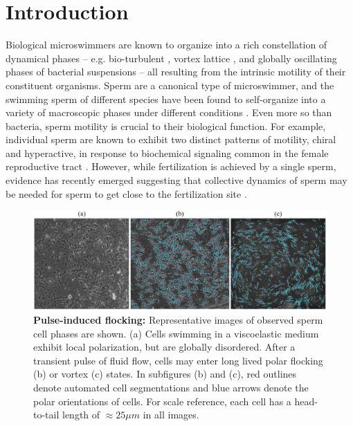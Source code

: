 \documentclass[reprint,unsortedaddress,amsmath,amssymb,aps,pre]{revtex4-2}
\begin{document}
\maketitle



\section{\label{sec::Introduction}Introduction}



Biological microswimmers are known to organize into a rich constellation of dynamical phases -- e.g. bio-turbulent \cite{2012_Wensink}, vortex lattice  \cite{2012_Nagai,xu2024self}, and globally oscillating phases \cite{2017_Chen} of bacterial suspensions -- all resulting from the intrinsic motility of their constituent organisms.
Sperm are a canonical type of microswimmer, and the swimming sperm of different species have been found to self-organize into a variety of macroscopic phases under different conditions \cite{riedel2005self,creppy2015turbulence}. Even more so than bacteria, sperm motility is crucial to their biological function. For example, individual sperm are known to exhibit two distinct patterns of motility, chiral and hyperactive, in response to biochemical signaling common in the female reproductive tract \cite{zaferani2023biphasic}. However, while fertilization is achieved by a single sperm, evidence has recently emerged suggesting that collective dynamics of sperm may be needed for sperm to get close to the fertilization site \cite{Qu2021cooperation,Phuyal2022}. 

\begin{figure}[t!]
    \centering
    \includegraphics[width=18cm]{fig_ExperimentalSnapshots.PNG}
    \caption{\label{fig::ExpMethods}
    \textbf{Pulse-induced flocking:} Representative images of observed sperm cell phases are shown. (a) Cells swimming in a viscoelastic medium exhibit local polarization, but are globally disordered. After a transient pulse of fluid flow, cells may enter long lived polar flocking (b) or vortex (c) states. In subfigures (b) and (c), red outlines denote automated cell segmentations and blue arrows denote the polar orientations of cells. For scale reference, each cell has a head-to-tail length of $\approx25\mu{m}$ in all images.}
\end{figure}
\end{document}
